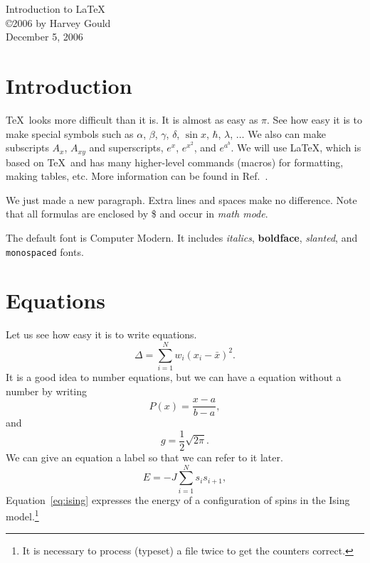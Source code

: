 \documentclass[12pt]{article}
\begin{document}
\begin{center}
{\large Introduction to \LaTeX} \\ %
\copyright 2006 by Harvey Gould \\
December 5, 2006
\end{center}

\section{Introduction}
\TeX\ looks more difficult than it is. It is almost as easy as $\pi$. See how easy it is to make special symbols such as $\alpha$, $\beta$, $\gamma$, $\delta$, $\sin x$, $\hbar$, $\lambda$, $\ldots$ We also can make subscripts
$A_{x}$, $A_{xy}$ and superscripts, $e^x$, $e^{x^2}$, and $e^{a^b}$. We will use \LaTeX, which is based on \TeX\ and has many higher-level commands (macros) for formatting, making tables, etc. More information can be found in Ref.~\cite{latex}.

We just made a new paragraph. Extra lines and spaces make no difference. Note that all formulas are enclosed by \$ and occur in \textit{math mode}.

The default font is Computer Modern. It includes \textit{italics}, \textbf{boldface}, \textsl{slanted}, and \texttt{monospaced} fonts.

\section{Equations}
Let us see how easy it is to write equations.
\begin{equation}
\Delta =\sum_{i=1}^N w_i (x_i - \bar{x})^2 .
\end{equation}
It is a good idea to number equations, but we can have a equation without a number by writing
\begin{equation}
P(x) = \frac{x - a}{b - a} , \nonumber
\end{equation}
and
\begin{equation}
g = \frac{1}{2} \sqrt{2\pi} . \nonumber
\end{equation}
We can give an equation a label so that we can refer to it later.
\begin{equation}
\label{eq:ising}
E = -J \sum_{i=1}^N s_i s_{i+1} ,
\end{equation}
Equation~\eqref{eq:ising} expresses the energy of a configuration of spins in the Ising model.\footnote{It is necessary to process (typeset) a file twice to get the counters correct.}
\end{document}
